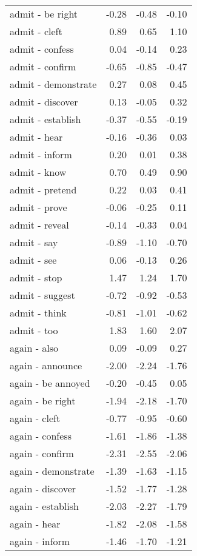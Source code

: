 \begin{longtable}{lrrr}
  admit - be right & -0.28 & -0.48 & -0.10 \\ 
  admit - cleft & 0.89 & 0.65 & 1.10 \\ 
  admit - confess & 0.04 & -0.14 & 0.23 \\ 
  admit - confirm & -0.65 & -0.85 & -0.47 \\ 
  admit - demonstrate & 0.27 & 0.08 & 0.45 \\ 
  admit - discover & 0.13 & -0.05 & 0.32 \\ 
  admit - establish & -0.37 & -0.55 & -0.19 \\ 
  admit - hear & -0.16 & -0.36 & 0.03 \\ 
  admit - inform & 0.20 & 0.01 & 0.38 \\ 
  admit - know & 0.70 & 0.49 & 0.90 \\ 
  admit - pretend & 0.22 & 0.03 & 0.41 \\ 
  admit - prove & -0.06 & -0.25 & 0.11 \\ 
  admit - reveal & -0.14 & -0.33 & 0.04 \\ 
  admit - say & -0.89 & -1.10 & -0.70 \\ 
  admit - see & 0.06 & -0.13 & 0.26 \\ 
  admit - stop & 1.47 & 1.24 & 1.70 \\ 
  admit - suggest & -0.72 & -0.92 & -0.53 \\ 
  admit - think & -0.81 & -1.01 & -0.62 \\ 
  admit - too & 1.83 & 1.60 & 2.07 \\ 
  again - also & 0.09 & -0.09 & 0.27 \\ 
  again - announce & -2.00 & -2.24 & -1.76 \\ 
  again - be annoyed & -0.20 & -0.45 & 0.05 \\ 
  again - be right & -1.94 & -2.18 & -1.70 \\ 
  again - cleft & -0.77 & -0.95 & -0.60 \\ 
  again - confess & -1.61 & -1.86 & -1.38 \\ 
  again - confirm & -2.31 & -2.55 & -2.06 \\ 
  again - demonstrate & -1.39 & -1.63 & -1.15 \\ 
  again - discover & -1.52 & -1.77 & -1.28 \\ 
  again - establish & -2.03 & -2.27 & -1.79 \\ 
  again - hear & -1.82 & -2.08 & -1.58 \\ 
  again - inform & -1.46 & -1.70 & -1.21 \\ 

\end{longtable}
